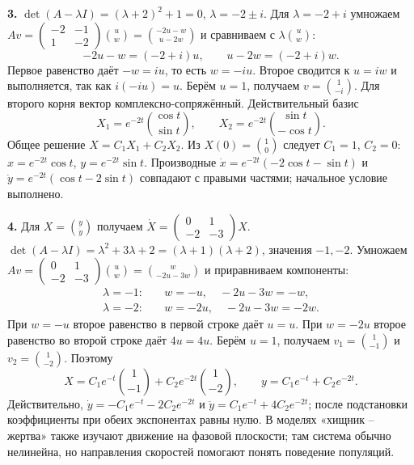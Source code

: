 \documentclass[12pt,a4paper]{article}
\newcommand{\col}[2]{\binom{#1}{#2}}
\newcommand{\mat}[4]{\begin{pmatrix}#1&#2\\#3&#4\end{pmatrix}}
\newcommand{\st}[1]{\par\medskip\noindent\textbf{#1}\quad}
\begin{document}
\newpage
\st{3.} $\det(A-\lambda I)=(\lambda+2)^2+1=0$, $\lambda=-2\pm i$.
Для $\lambda=-2+i$ умножаем
$Av=\mat{-2}{-1}{1}{-2}\col{u}{w}=\col{-2u-w}{u-2w}$ и сравниваем с
$\lambda\col{u}{w}$:
\[
-2u-w=(-2+i)u,\qquad u-2w=(-2+i)w .
\]
Первое равенство даёт $-w=iu$, то есть $w=-iu$. Второе сводится к
$u=iw$ и выполняется, так как $i(-iu)=u$. Берём $u=1$, получаем
$v=\col1{-i}$. Для второго корня вектор комплексно-сопряжённый.
Действительный базис
\[X_1=e^{-2t}\col{\cos t}{\sin t},\qquad X_2=e^{-2t}\col{\sin t}{-\cos t}.\]
Общее решение $X=C_1X_1+C_2X_2$. Из $X(0)=\col10$ следует $C_1=1$, $C_2=0$: $x=e^{-2t}\cos t$, $y=e^{-2t}\sin t$. Производные $\dot x=e^{-2t}(-2\cos t-\sin t)$ и $\dot y=e^{-2t}(\cos t-2\sin t)$ совпадают с правыми частями; начальное условие выполнено.
\st{4.} Для $X=\col{y}{\dot y}$ получаем $\dot X=\mat{0}{1}{-2}{-3}X$.
$\det(A-\lambda I)=\lambda^2+3\lambda+2=(\lambda+1)(\lambda+2)$, значения $-1,-2$.
Умножаем $Av=\mat{0}{1}{-2}{-3}\col{u}{w}=\col{w}{-2u-3w}$ и
приравниваем компоненты:
\[
\begin{aligned}
\lambda=-1:\quad &w=-u,\quad -2u-3w=-w,\\
\lambda=-2:\quad &w=-2u,\quad -2u-3w=-2w .
\end{aligned}
\]
При $w=-u$ второе равенство в первой строке даёт $u=u$.
При $w=-2u$ второе равенство во второй строке даёт $4u=4u$.
Берём $u=1$, получаем $v_1=\col1{-1}$ и $v_2=\col1{-2}$. Поэтому
\[X=C_1e^{-t}\col1{-1}+C_2e^{-2t}\col1{-2},\qquad y=C_1e^{-t}+C_2e^{-2t}.\]
Действительно, $\dot y=-C_1e^{-t}-2C_2e^{-2t}$ и $\ddot y=C_1e^{-t}+4C_2e^{-2t}$; после подстановки коэффициенты при обеих экспонентах равны нулю.
\medskip
В моделях «хищник -- жертва» также изучают движение на фазовой плоскости; там система обычно нелинейна, но направления скоростей помогают понять поведение популяций.
\end{document}
